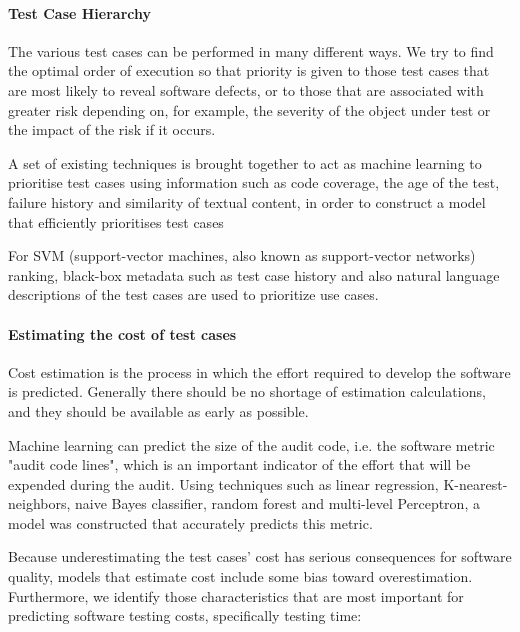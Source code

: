 \documentclass[12pt]{article}
\begin{document}
\paragraph{Test Case Hierarchy}

The various test cases can be performed in many different ways. We try to find the optimal order of execution so that priority is given to those test cases that are most likely to reveal software defects, or to those that are associated with greater risk depending on, for example, the severity of the object under test or the impact of the risk if it occurs.

\par A set of existing techniques is brought together to act as machine learning to prioritise test cases using information such as code coverage, the age of the test, failure history and similarity of textual content, in order to construct a model that efficiently prioritises test cases

\par For SVM (support-vector machines, also known as support-vector networks) ranking, black-box metadata such as test case history and also natural language descriptions of the test cases are used to prioritize use cases.

\paragraph{Estimating the cost of test cases}
Cost estimation is the process in which the effort required to develop the software is predicted. Generally there should be no shortage of estimation calculations, and they should be available as early as possible.


\par Machine learning can predict the size of the audit code, i.e. the software metric "audit code lines", which is an important indicator of the effort that will be expended during the audit. Using techniques such as linear regression, K-nearest-neighbors, naive Bayes classifier, random forest and multi-level Perceptron, a model was constructed that accurately predicts this metric.

\par Because underestimating the test cases' cost has serious consequences for software quality, models that estimate cost include some bias toward overestimation. Furthermore, we identify those characteristics that are most important for predicting software testing costs, specifically testing time:
\end{document}
